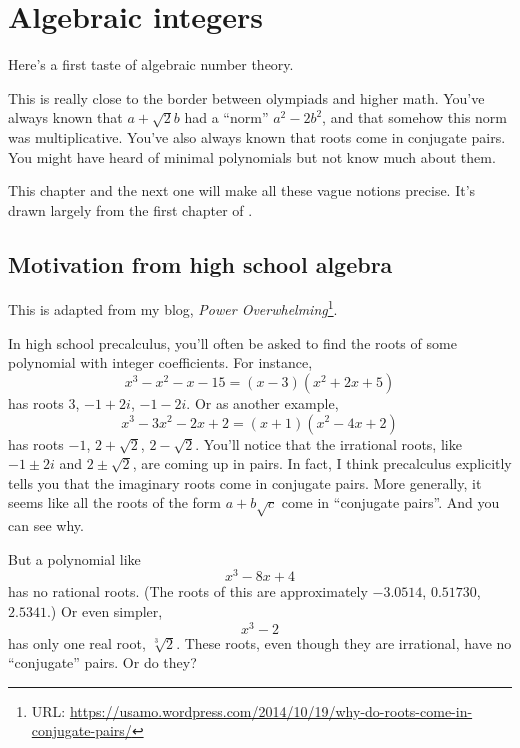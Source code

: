 \chapter{Algebraic integers}
Here's a first taste of algebraic number theory.

This is really close to the border between olympiads and higher math.
You've always known that $a+\sqrt2 b$ had a ``norm'' $a^2-2b^2$,
and that somehow this norm was multiplicative.
You've also always known that roots come in conjugate pairs.
You might have heard of minimal polynomials but not know much about them.

This chapter and the next one will make all these vague notions precise.
It's drawn largely from the first chapter of \cite{ref:oggier_NT}.

\section{Motivation from high school algebra}
This is adapted from my blog, \emph{Power Overwhelming}\footnote{URL: \url{https://usamo.wordpress.com/2014/10/19/why-do-roots-come-in-conjugate-pairs/}}.

In high school precalculus, you'll often be asked to find the roots of some polynomial with integer coefficients.
For instance,
\[ x^3 - x^2 - x - 15 = (x-3)(x^2+2x+5) \]
has roots $3$, $-1+2i$, $-1-2i$.
Or as another example, 
\[ x^3 - 3x^2 - 2x + 2 = (x+1)(x^2-4x+2) \]
has roots $-1$, $2 + \sqrt 2$, $2 - \sqrt 2$.
You'll notice that the irrational roots, like $-1 \pm 2i$ and $2 \pm \sqrt 2$, are coming up in pairs. In fact, I think precalculus explicitly tells you that the imaginary roots come in conjugate pairs. More generally, it seems like all the roots of the form $a + b \sqrt c$ come in ``conjugate pairs''. And you can see why.

But a polynomial like
\[ x^3 - 8x + 4 \]
has no rational roots.
(The roots of this are approximately $-3.0514$, $0.51730$, $2.5341$.)
Or even simpler,
\[ x^3 - 2 \]
has only one real root, $\sqrt[3]{2}$.
These roots, even though they are irrational, have no ``conjugate'' pairs.
Or do they?

